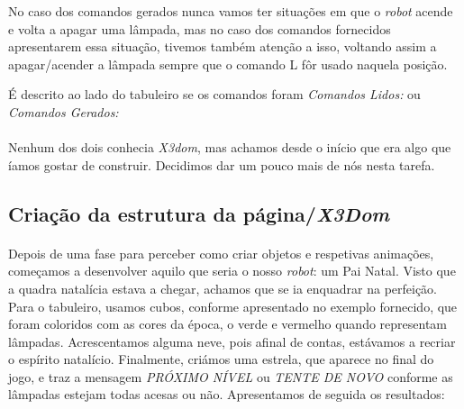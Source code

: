 \documentclass[a4paper,12pt]{article}
\begin{document}
No caso dos comandos gerados nunca vamos ter situações em que o \emph{robot} acende e volta a apagar uma lâmpada, mas no caso dos comandos fornecidos apresentarem essa situação, tivemos também atenção a isso, voltando assim a apagar/acender a lâmpada sempre que o comando L fôr usado naquela posição.

É descrito ao lado do tabuleiro se os comandos foram \emph{Comandos Lidos:} ou \emph{Comandos Gerados:}
\paragraph{}
Nenhum dos dois conhecia \emph{X3dom}, mas achamos desde o início que era algo que íamos gostar de construir. Decidimos dar um pouco mais de nós nesta tarefa.

\subsection{Criação da estrutura da página/\emph{X3Dom}}

\paragraph{}
Depois de uma fase para perceber como criar objetos e respetivas animações, começamos a desenvolver aquilo que seria o nosso \emph{robot}: um Pai Natal. Visto que a quadra natalícia estava a chegar, achamos que se ia enquadrar na perfeição.
Para o tabuleiro, usamos cubos, conforme apresentado no exemplo fornecido, que foram coloridos com as cores da época, o verde e vermelho quando representam lâmpadas. Acrescentamos alguma neve, pois afinal de contas, estávamos a recriar o espírito natalício.
Finalmente, criámos uma estrela, que aparece no final do jogo, e traz a mensagem \emph{PRÓXIMO NÍVEL} ou \emph{TENTE DE NOVO} conforme as lâmpadas estejam todas acesas ou não.
Apresentamos de seguida os resultados:
\end{document}
